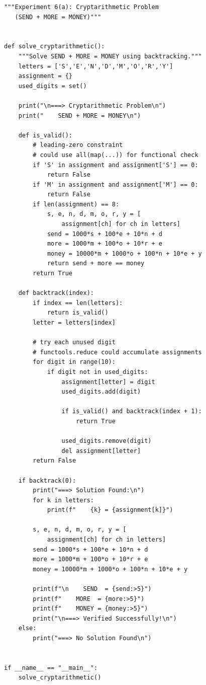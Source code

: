 \documentclass[12pt,a4paper]{article}
\begin{document}
\begin{lstlisting}[style=pythonstyle]
"""Experiment 6(a): Cryptarithmetic Problem
   (SEND + MORE = MONEY)"""


def solve_cryptarithmetic():
    """Solve SEND + MORE = MONEY using backtracking."""
    letters = ['S','E','N','D','M','O','R','Y']
    assignment = {}
    used_digits = set()

    print("\n===> Cryptarithmetic Problem\n")
    print("    SEND + MORE = MONEY\n")

    def is_valid():
        # leading-zero constraint
        # could use all(map(...)) for functional check
        if 'S' in assignment and assignment['S'] == 0:
            return False
        if 'M' in assignment and assignment['M'] == 0:
            return False
        if len(assignment) == 8:
            s, e, n, d, m, o, r, y = [
                assignment[ch] for ch in letters]
            send = 1000*s + 100*e + 10*n + d
            more = 1000*m + 100*o + 10*r + e
            money = 10000*m + 1000*o + 100*n + 10*e + y
            return send + more == money
        return True

    def backtrack(index):
        if index == len(letters):
            return is_valid()
        letter = letters[index]

        # try each unused digit
        # functools.reduce could accumulate assignments
        for digit in range(10):
            if digit not in used_digits:
                assignment[letter] = digit
                used_digits.add(digit)

                if is_valid() and backtrack(index + 1):
                    return True

                used_digits.remove(digit)
                del assignment[letter]
        return False

    if backtrack(0):
        print("===> Solution Found:\n")
        for k in letters:
            print(f"    {k} = {assignment[k]}")

        s, e, n, d, m, o, r, y = [
            assignment[ch] for ch in letters]
        send = 1000*s + 100*e + 10*n + d
        more = 1000*m + 100*o + 10*r + e
        money = 10000*m + 1000*o + 100*n + 10*e + y

        print(f"\n    SEND  = {send:>5}")
        print(f"    MORE  = {more:>5}")
        print(f"    MONEY = {money:>5}")
        print("\n===> Verified Successfully!\n")
    else:
        print("===> No Solution Found\n")


if __name__ == "__main__":
    solve_cryptarithmetic()
\end{lstlisting}
\end{document}
